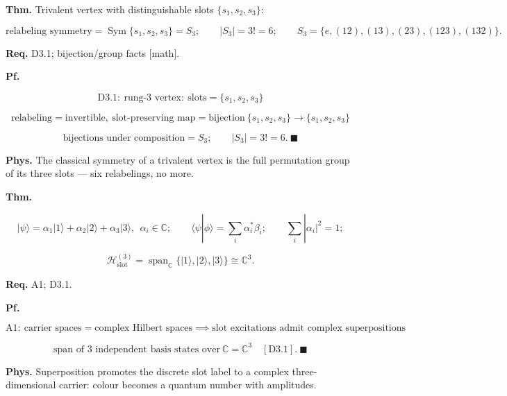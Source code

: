 \begin{theorem}\label{tag:CT3-1}
\textbf{Thm.} Trivalent vertex with distinguishable slots $\{s_1,s_2,s_3\}$:

\[
\text{relabeling symmetry}=\operatorname{Sym}\{s_1,s_2,s_3\}=S_3;\qquad
|S_3|=3!=6;\qquad
S_3=\{e,(12),(13),(23),(123),(132)\}.
\]

\textbf{Req.} D3.1; bijection/group facts [math].

\textbf{Pf.}

\[
\mathrm{D3.1}:\ \text{rung-3 vertex}:\ \text{slots}=\{s_1,s_2,s_3\}
\]

\[
\text{relabeling}=\text{invertible},\ \text{slot-preserving map}=\text{bijection}\ \{s_1,s_2,s_3\}\to\{s_1,s_2,s_3\}
\]

\[
\text{bijections under composition}=S_3;\qquad|S_3|=3!=6.\ \blacksquare
\]

\textbf{Phys.} The classical symmetry of a trivalent vertex is the full permutation group of its three slots — six relabelings, no more.

\end{theorem}

\begin{theorem}\label{tag:CT3-2}
\textbf{Thm.}

\[
|\psi\rangle=\alpha_1|1\rangle+\alpha_2|2\rangle+\alpha_3|3\rangle,\ \ \alpha_i\in\mathbb C;\qquad
\langle\psi|\phi\rangle=\textstyle\sum_i\alpha_i^\ast\beta_i;\qquad
\textstyle\sum_i|\alpha_i|^2=1;
\]

\[
\mathcal H^{(3)}_{\mathrm{slot}}=\operatorname{span}_{\mathbb C}\{|1\rangle,|2\rangle,|3\rangle\}\cong\mathbb C^3 .
\]

\textbf{Req.} A1; D3.1.

\textbf{Pf.}

\[
\mathrm{A1}:\ \text{carrier spaces}=\text{complex Hilbert spaces}\implies\text{slot excitations admit complex superpositions}
\]

\[
\text{span of 3 independent basis states over}\ \mathbb C=\mathbb C^3\quad[\mathrm{D3.1}].\ \blacksquare
\]

\textbf{Phys.} Superposition promotes the discrete slot label to a complex three-dimensional carrier: colour becomes a quantum number with amplitudes.

\end{theorem}

